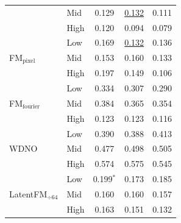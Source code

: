\begin{table}[ht]
{\begin{tabular}{llccc}
 & Mid & 0.129 & \underline{0.132} & 0.111 \\
 & High & 0.120 & 0.094 & 0.079 \\
\midrule
\multirow{3}{*}{FM$_\text{pixel}$} & Low & 0.169 & \underline{0.132} & 0.136 \\
 & Mid & 0.153 & 0.160 & 0.133 \\
 & High & 0.197 & 0.149 & 0.106 \\
\midrule
\multirow{3}{*}{FM$_\text{fourier}$} & Low & 0.334 & 0.307 & 0.290 \\
 & Mid & 0.384 & 0.365 & 0.354 \\
 & High & 0.123 & 0.123 & 0.116 \\
\midrule
\multirow{3}{*}{WDNO} & Low & 0.390 & 0.388 & 0.413 \\
 & Mid & 0.477 & 0.498 & 0.505 \\
 & High & 0.574 & 0.575 & 0.545 \\
\midrule
\multirow{3}{*}{LatentFM$_{\div 64}$} & Low & 0.199$^{*}$ & 0.173 & 0.185 \\
 & Mid & 0.160 & 0.160 & 0.157 \\
 & High & 0.163 & 0.151 & 0.132 \\
\bottomrule
\end{tabular}
}
\end{table}
